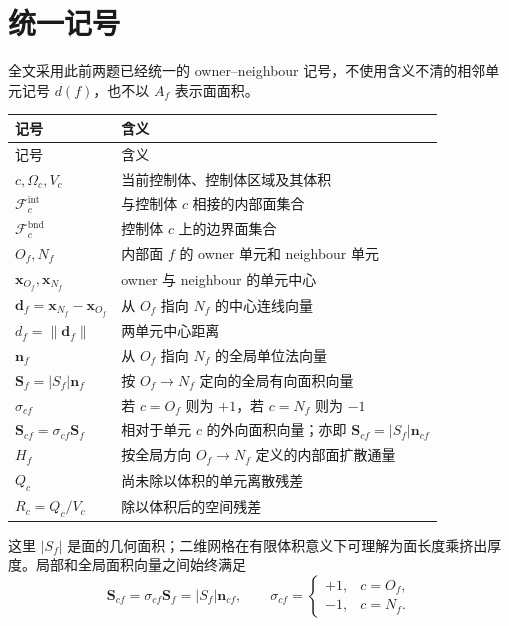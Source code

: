 \documentclass[UTF8,a4paper,11pt]{ctexart}
\newcommand{\vect}[1]{\bm{#1}}
\newcommand{\Sf}{\vect S_f}
\newcommand{\Scf}{\vect S_{cf}}
\newcommand{\df}{\vect d_f}
\newcommand{\nf}{\vect n_f}
\begin{document}
\section{统一记号}

全文采用此前两题已经统一的 owner--neighbour 记号，不使用含义不清的相邻单元记号 \(d(f)\)，也不以 \(A_f\) 表示面面积。

\begin{longtable}{>{\centering\arraybackslash}p{}p{}}
\toprule
记号 & 含义\\
\midrule
\endfirsthead
\toprule
记号 & 含义\\
\midrule
\endhead
\(c,\Omega_c,V_c\) & 当前控制体、控制体区域及其体积\\
\(\mathcal F_c^{\mathrm{int}}\) & 与控制体 \(c\) 相接的内部面集合\\
\(\mathcal F_c^{\mathrm{bnd}}\) & 控制体 \(c\) 上的边界面集合\\
\(O_f,N_f\) & 内部面 \(f\) 的 owner 单元和 neighbour 单元\\
\(\vect x_{O_f},\vect x_{N_f}\) & owner 与 neighbour 的单元中心\\
\(\df=\vect x_{N_f}-\vect x_{O_f}\) & 从 \(O_f\) 指向 \(N_f\) 的中心连线向量\\
\(d_f=\lVert\df\rVert\) & 两单元中心距离\\
\(\nf\) & 从 \(O_f\) 指向 \(N_f\) 的全局单位法向量\\
\(\Sf=|S_f|\nf\) & 按 \(O_f\to N_f\) 定向的全局有向面积向量\\
\(\sigma_{cf}\) & 若 \(c=O_f\) 则为 \(+1\)，若 \(c=N_f\) 则为 \(-1\)\\
\(\Scf=\sigma_{cf}\Sf\) & 相对于单元 \(c\) 的外向面积向量；亦即 \(\Scf=|S_f|\vect n_{cf}\)\\
\(H_f\) & 按全局方向 \(O_f\to N_f\) 定义的内部面扩散通量\\
\(Q_c\) & 尚未除以体积的单元离散残差\\
\(R_c=Q_c/V_c\) & 除以体积后的空间残差\\
\bottomrule
\end{longtable}

这里 \(|S_f|\) 是面的几何面积；二维网格在有限体积意义下可理解为面长度乘挤出厚度。局部和全局面积向量之间始终满足
\begin{equation}
  \Scf=\sigma_{cf}\Sf=|S_f|\vect n_{cf},
  \qquad
  \sigma_{cf}=
  \begin{cases}
  +1,&c=O_f,\\
  -1,&c=N_f.
  \end{cases}
  \label{eq:sigma}
\end{equation}
\end{document}

